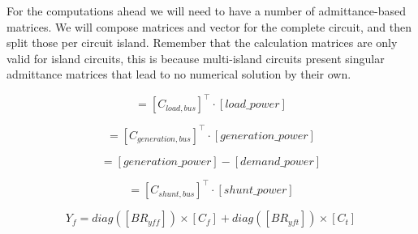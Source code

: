 \documentclass[nols,a4paper,twoside,symmetric,notoc,fleqn]{tufte-book}
\begin{document}
For the computations ahead we will need to have a number of admittance-based matrices. We will compose matrices and vector for the complete circuit, and then split those per circuit island. Remember that the calculation matrices are only valid for island circuits, this is because multi-island circuits present singular admittance matrices that lead to no numerical solution by their own.

%
%
%
%



\begin{equation}
[demand\_power ]= [C_{load,bus}]^\top \cdot [load\_power]
\end{equation}

\begin{equation}
[generation\_power ]= [C_{generation,bus}]^\top \cdot [generation\_power]
\end{equation}

\begin{equation}
[S_{bus}] = [generation\_power]  - [demand\_power]
\end{equation}

\begin{equation}
[Ysh ]= [C_{shunt,bus}]^\top \cdot [shunt\_power]
\end{equation}

\begin{equation}
Y_f = diag([BR_{yff}]) \times [C_f] + diag([BR_{yft}]) \times [C_t]
\end{equation}
\end{document}
